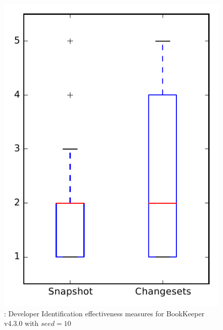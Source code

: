 
\begin{figure}
\centering
\includegraphics[height=0.4\textheight]{figures/dit_seed/rq1_bookkeeper_10}
\caption{\rtwo: Developer Identification effectiveness measures for BookKeeper v4.3.0 with $seed=10$}
\label{fig:dit_seed:rq1:bookkeeper}
\end{figure}
